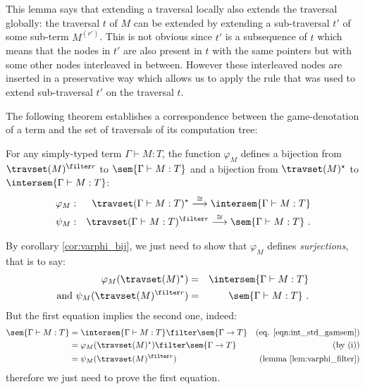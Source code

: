 This lemma says that extending a traversal locally also extends the
traversal globally: the traversal $t$ of $M$ can be extended by
extending a sub-traversal $t'$ of some sub-term $M^{(r')}$. This is
not obvious since $t'$ is a subsequence of $t$ which means that the
nodes in $t'$ are also present in $t$ with the same pointers but
with some other nodes interleaved in between. However these
interleaved nodes are inserted in a preservative way which allows us
to apply the rule that was used to extend sub-traversal $t'$ on the
traversal $t$.
\bigskip

The following theorem establishes a correspondence between the
game-denotation of a term and the set of traversals of its
computation tree:
\begin{theorem}
\label{thm:correspondence}
 For any simply-typed term $\Gamma \vdash M :T$,
the function $\varphi_M$ defines a bijection from $\travset(M)^{\filter
r}$ to $\sem{\Gamma \vdash M : T}$ and a bijection from
$\travset(M)^\star$ to $\intersem{\Gamma \vdash M : T}$:
\begin{eqnarray*}
 \varphi_M  &:& \travset(\Gamma \vdash M : T)^\star \stackrel{\cong}{\longrightarrow} \intersem{\Gamma \vdash M :T} \\
 \psi_M  &:& \travset(\Gamma \vdash M : T)^{\filter r} \stackrel{\cong}{\longrightarrow} \sem{\Gamma \vdash M :T} \ .
\end{eqnarray*}

\end{theorem}

\begin{remark}
\label{rem:corresp_proofreduction}
    By corollary \ref{cor:varphi_bij}, we just need to show that
    $\varphi_M$ defines \emph{surjections}, that is to
    say:
    \begin{eqnarray*}
    \varphi_M(\travset(M)^\star) &=& \intersem{\Gamma \vdash M : T} \\
    \mbox{and } \psi_M(\travset(M)^{\filter r}) &=& \sem{\Gamma \vdash M : T} \ .
    \end{eqnarray*}
    But the first equation implies the second one, indeed:
    \begin{align*}
    \sem{\Gamma \vdash M : T} &= \intersem{\Gamma \vdash M : T} \filter \sem{\Gamma \rightarrow T} & \mbox{(eq. \ref{eqn:int_std_gamsem})} \\
            &= \varphi_M(\travset(M)^\star) \filter \sem{\Gamma \rightarrow T} & \mbox{(by (i))}\\
            &= \psi_M(\travset(M)^{\filter r}) & \mbox{(lemma \ref{lem:varphi_filter})}
    \end{align*}
    therefore we just need to prove the first equation.
\end{remark}

